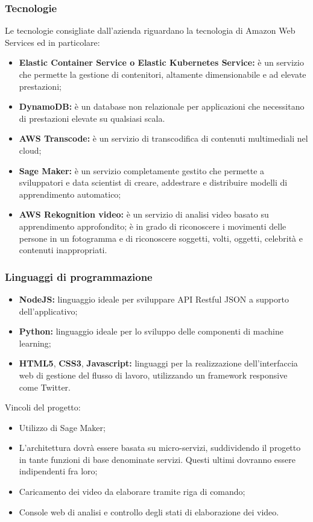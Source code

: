     \subsubsection{Tecnologie}
    Le tecnologie consigliate dall'azienda riguardano la tecnologia di Amazon Web Services ed in particolare:
    \begin{itemize}
        \item \textbf{Elastic Container Service o Elastic Kubernetes Service: }è un servizio che permette la gestione di contenitori, altamente dimensionabile e ad elevate prestazioni;
        \item \textbf{DynamoDB: }è un database non relazionale per applicazioni che necessitano di prestazioni elevate su qualsiasi scala.
        \item \textbf{AWS Transcode: }è un servizio di transcodifica di contenuti multimediali nel cloud;
        \item \textbf{Sage Maker: } è un servizio completamente gestito che permette a sviluppatori e data scientist di creare, addestrare e distribuire modelli di apprendimento automatico;
        \item \textbf{AWS Rekognition video: } è un servizio di analisi video basato su apprendimento approfondito; è in grado di riconoscere i movimenti delle persone in un fotogramma e di riconoscere soggetti, volti, oggetti, celebrità e contenuti inappropriati.
    \end{itemize}
        \subsubsection{Linguaggi di programmazione}
        \begin{itemize}
            \item \textbf{NodeJS: }linguaggio ideale per sviluppare API Restful JSON a supporto dell'applicativo;
            \item \textbf{Python: }linguaggio ideale per lo sviluppo delle componenti di machine learning;
            \item \textbf{HTML5}, \textbf{CSS3}, \textbf{Javascript: }linguaggi per la realizzazione dell'interfaccia web di gestione del flusso di lavoro, utilizzando un framework responsive come Twitter.
        \end{itemize}
    Vincoli del progetto:
    \begin{itemize}
        \item Utilizzo di Sage Maker;
        \item L'architettura dovrà essere basata su micro-servizi, suddividendo il progetto in tante funzioni di base denominate servizi. Questi ultimi dovranno essere indipendenti fra loro;
        \item Caricamento dei video da elaborare tramite riga di comando;
        \item Console web di analisi e controllo degli stati di elaborazione dei video.
      \end{itemize}
    
